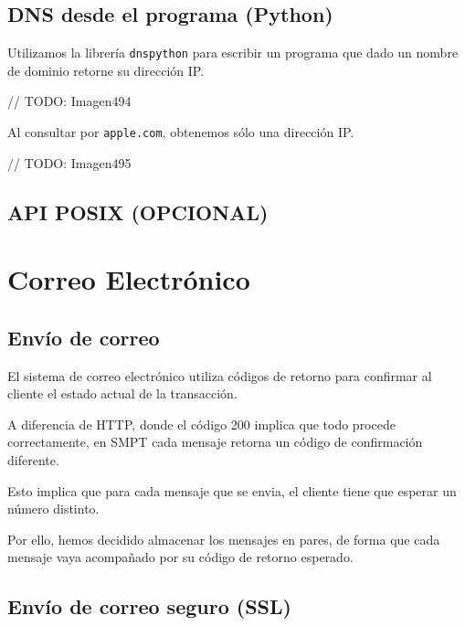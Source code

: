 \subsection{DNS desde el programa (Python)}

Utilizamos la librería \verb#dnspython# para escribir un programa que
dado un nombre de dominio retorne su dirección IP.

// TODO: Imagen494

Al consultar por \verb#apple.com#, obtenemos sólo una dirección IP.

// TODO: Imagen495

\subsection{API POSIX (OPCIONAL)}

\section{Correo Electrónico}

\subsection{Envío de correo}

El sistema de correo electrónico utiliza códigos de retorno para confirmar
al cliente el estado actual de la transacción.

A diferencia de HTTP, donde el código 200 implica que todo procede correctamente,
en SMPT cada mensaje retorna un código de confirmación diferente.

Esto implica que para cada mensaje que se envia, el cliente tiene que esperar un
número distinto.


Por ello, hemos decidido almacenar los mensajes en pares,
de forma que cada mensaje vaya acompañado por su código de retorno esperado.

\subsection{Envío de correo seguro (SSL)}

